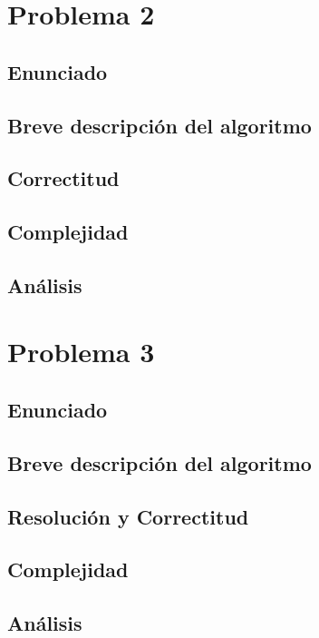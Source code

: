 \documentclass{article}
\theoremstyle{definition}
\theoremstyle{remark}
\begin{document}
\section{Problema 2}

\subsection{Enunciado}

\subsection{Breve descripción del algoritmo}

\subsection{Correctitud}

\subsection{Complejidad}

\subsection{Análisis}

\pagebreak

\section{Problema 3}

\subsection{Enunciado}

\subsection{Breve descripción del algoritmo}

\subsection{Resolución y Correctitud}

\subsection{Complejidad}

\subsection{Análisis}
\end{document}
